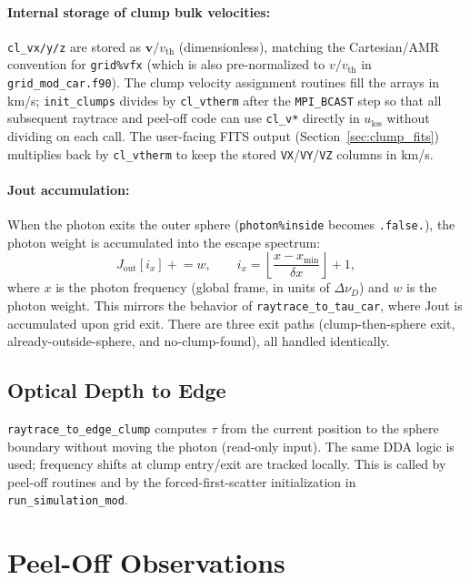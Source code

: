 \documentclass[english,a4paper]{my_memo}
\begin{document}
\paragraph{Internal storage of clump bulk velocities:}
\texttt{cl\_vx/y/z} are stored as $\boldsymbol{v}/v_\mathrm{th}$ (dimensionless),
matching the Cartesian/AMR convention for \texttt{grid\%vfx} (which is also
pre-normalized to $v/v_\mathrm{th}$ in \texttt{grid\_mod\_car.f90}).  The
clump velocity assignment routines fill the arrays in km/s; \texttt{init\_clumps}
divides by \texttt{cl\_vtherm} after the \texttt{MPI\_BCAST} step so that
all subsequent raytrace and peel-off code can use \texttt{cl\_v*} directly
in $u_\mathrm{los}$ without dividing on each call.  The user-facing FITS
output (Section~\ref{sec:clump_fits}) multiplies back by
\texttt{cl\_vtherm} to keep the stored \texttt{VX}/\texttt{VY}/\texttt{VZ}
columns in km/s.

\paragraph{Jout accumulation:}
When the photon exits the outer sphere (\texttt{photon\%inside} becomes
\texttt{.false.}), the photon weight is accumulated into the escape spectrum:
\begin{equation}
  J_\mathrm{out}[i_x] \mathrel{+}= w,\qquad
  i_x = \left\lfloor \frac{x - x_\mathrm{min}}{\delta x}\right\rfloor + 1,
\end{equation}
where $x$ is the photon frequency (global frame, in units of $\Delta\nu_D$)
and $w$ is the photon weight.  This mirrors the behavior of
\texttt{raytrace\_to\_tau\_car}, where Jout is accumulated upon grid exit.
There are three exit paths (clump-then-sphere exit, already-outside-sphere,
and no-clump-found), all handled identically.

\subsection{Optical Depth to Edge}

\texttt{raytrace\_to\_edge\_clump} computes $\tau$ from the current position
to the sphere boundary without moving the photon (read-only input).  The same
DDA logic is used; frequency shifts at clump entry/exit are tracked locally.
This is called by peel-off routines and by the forced-first-scatter
initialization in \texttt{run\_simulation\_mod}.

\section{Peel-Off Observations}
\end{document}
